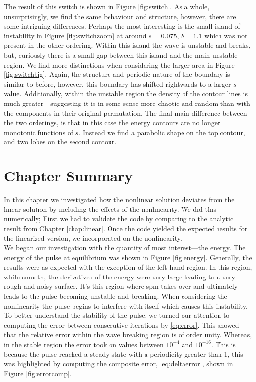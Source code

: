 The result of this switch is shown in Figure \ref{fig:switch}. As a whole, unsurprisingly, we find the same behaviour and structure, however, there are some intriguing differences. Perhaps the most interesting is the small island of instability in Figure \ref{fig:switchzoom} at around $s = 0.075$, $b = 1.1$ which was not present in the other ordering. Within this island the wave is unstable and breaks, but, curiously there is a small gap between this island and the main unstable region. We find more distinctions when considering the larger area in Figure \ref{fig:switchbig}. Again, the structure and periodic nature of the boundary is similar to before, however, this boundary has shifted rightwards to a larger $s$ value. Additionally, within the unstable region the density of the contour lines is much greater---suggesting it is in some sense more chaotic and random than with the components in their original permutation. The final main difference between the two orderings, is that in this case the energy contours are no longer monotonic functions of $s$. Instead we find a parabolic shape on the top contour, and two lobes on the second contour. \\

\section{Chapter Summary}
In this chapter we investigated how the nonlinear solution deviates from the linear solution by including the effects of the nonlinearity. We did this numerically; First we had to validate the code by comparing to the analytic result from Chapter \ref{chap:linear}. Once the code yielded the expected results for the linearized version, we incorporated on the nonlinearity. \\

We began our investigation with the quantity of most interest---the energy. The energy of the pulse at equilibrium was shown in Figure \ref{fig:energy}. Generally, the results were as expected with the exception of the left-hand region. In this region, while smooth, the derivatives of the energy were very large leading to a very rough and noisy surface. It's this region where \gls{spm} takes over and ultimately leads to the pulse becoming unstable and breaking. When considering the nonlinearity the pulse begins to interfere with itself which causes this instability. \\

To better understand the stability of the pulse, we turned our attention to computing the error between consecutive iterations by \eqref{eq:error}. This showed that the relative error within the wave breaking region is of order unity. Whereas, in the stable region the error took on values between $10^{-4}$ and $10^{-16}$. This is because the pulse reached a steady state with a periodicity greater than 1, this was highlighted by computing the composite error, \eqref{eq:deltaerror}, shown in Figure \ref{fig:errorcomp}. \\

